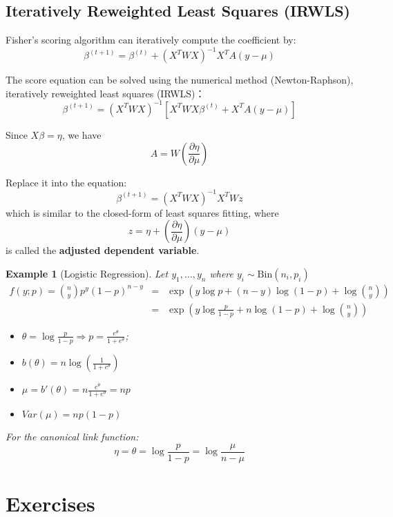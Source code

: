 \documentclass[11pt,addpoints]{exam}
\newtheorem{example}{Example}
\begin{document}
\begin{CJK*}{UTF8}{gbsn}
\subsection{Iteratively Reweighted Least Squares (IRWLS)}
Fisher's scoring algorithm can iteratively compute the coefficient by:
$$
\beta^{(t+1)} = \beta^{(t)} + (X^T W X)^{-1} X^T A (y - \mu) 
$$

The score equation can be solved using the numerical method (Newton-Raphson), iteratively reweighted least squares (IRWLS)：
$$
\beta^{(t+1)} = \left( X^T W X \right)^{-1} \left[ X^T W X \beta^{(t)} + X^T A (y - \mu)\right]
$$

Since $X\beta = \eta$, we have
$$
A = W\left( \frac{\partial \eta}{\partial \mu}\right)
$$

Replace it into the equation:
$$
\beta^{(t+1)}  = \left( X^T W X \right)^{-1} X^T W z
$$
which is similar to the closed-form of least squares fitting, where
$$
z = \eta + \left( \frac{\partial \eta}{\partial \mu}\right) (y-\mu)
$$
is called the \textbf{adjusted dependent variable}.


\begin{example}[Logistic Regression]

Let $y_1, \dots, y_n$ where $y_i \sim \text{Bin}(n_i, p_i)$
$$
\begin{array}{lcl}
f(y; p) = \binom{n}{y} p^y (1-p)^{n-y} &=& \exp \left( y\log p + (n-y)\log(1-p) + \log \binom{n}{y} \right) \\
&=& \exp\left(y\log \frac{p}{1-p} + n\log(1-p) + \log \binom{n}{y} \right)
\end{array}
$$
\begin{itemize}
	\item $\theta = \log \frac{p}{1-p} \Rightarrow p = \frac{e^{\theta}}{1+e^{\theta}}$;
	\item $b(\theta) = n \log \left(\frac{1}{1+e^{\theta}}\right)$
	\item $\mu = b'(\theta) = n \frac{e^{\theta}}{1+e^{\theta}} = np$
	\item $Var(\mu) = np(1-p)$
\end{itemize}
For the canonical link function:
$$
\eta = \theta = \log \frac{p}{1-p} = \log \frac{\mu}{n-\mu}
$$
\end{example}

\section{Exercises}

\begin{questions}


\end{questions}
\end{CJK*}
\end{document}
